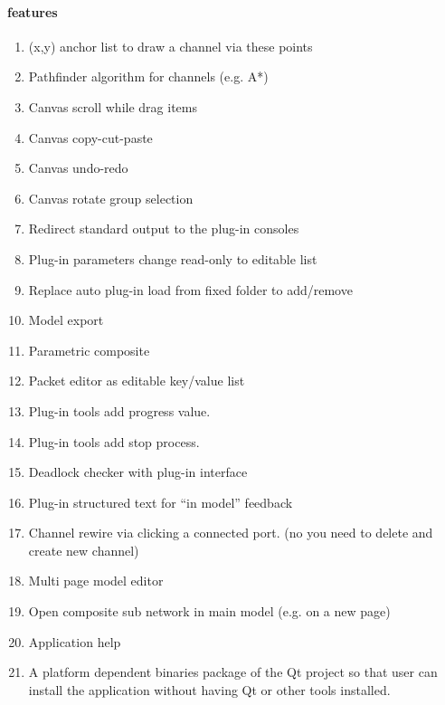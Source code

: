 
\paragraph{features}
\begin{enumerate}
\item	(x,y) anchor list to draw a channel via these points
\item	Pathfinder algorithm for channels (e.g. A*)
\item	Canvas scroll while drag items
\item	Canvas copy-cut-paste
\item	Canvas undo-redo
\item	Canvas rotate group selection
\item	Redirect standard output to the plug-in consoles
\item	Plug-in parameters change read-only to editable list
\item	Replace auto plug-in load from fixed folder to add/remove
\item	Model export
\item	Parametric composite
\item	Packet editor as editable key/value list
\item	Plug-in tools add progress value.
\item	Plug-in tools add stop process. 
\item	Deadlock checker with plug-in interface
\item	Plug-in structured text for “in model” feedback
\item Channel rewire via clicking a connected port. (no you need to delete and
create new channel)
\item	Multi page model editor
\item	Open composite sub network in main model (e.g. on a new page)
\item	Application help
\item A platform dependent binaries package of the Qt project so that user can
install the application without having Qt or other tools installed.
\end{enumerate}
